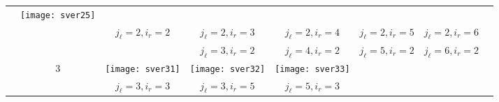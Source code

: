 \documentclass[12pt]{article}
\theoremstyle{definition}
\theoremstyle{remark}
\begin{document}
\begin{table}
{\begin{tabular}{ r|c|c|c|c|c|c|c| }
\begin{minipage}{.20\textwidth}
\end{minipage} & \begin{minipage}{.20\textwidth}
\texttt{[image: sver25]}
\end{minipage}    \\
\cline{3-7}
&  & $j_{\ell}=2,i_r=2$ & $j_{\ell}=2,i_r=3$ & $j_{\ell}=2,i_r=4$ & $j_{\ell}=2,i_r=5$ & $j_{\ell}=2,i_r=6$   \\
\cline{3-7}
&  & & $j_{\ell}=3,i_r=2$ & $j_{\ell}=4,i_r=2$ & $j_{\ell}=5,i_r=2$ & $j_{\ell}=6,i_r=2$   \\
\cline{2-7}
& 3 & \begin{minipage}{.20\textwidth}
	\vspace{3mm}
	\texttt{[image: sver31]}\vspace{3mm}
\end{minipage} & \begin{minipage}{.20\textwidth}
\texttt{[image: sver32]}
\end{minipage} & \begin{minipage}{.20\textwidth}
\texttt{[image: sver33]}\label{test}
\end{minipage} &  &    \\
\cline{3-7}
&  & $j_{\ell}=3,i_r=3$ & $j_{\ell}=3,i_r=5$ & $j_{\ell}=5,i_r=3$ & &    \\
\cline{2-7}
\end{tabular}	}
\end{table}
\end{document}
